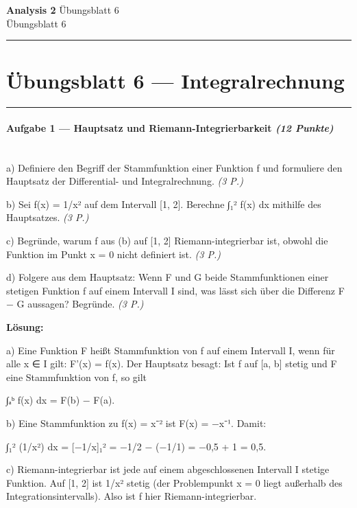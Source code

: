 \documentclass[11pt, a4paper]{article}
\providecommand{\nichttitle}{Übungsblatt}
\providecommand{\nichtsubtitle}{}
\renewcommand{\nichttitle}{Analysis 2}
\renewcommand{\nichtsubtitle}{Übungsblatt 6}
\begin{document}
\begin{center}
{\Large\bfseries\color{accent}\nichttitle}
\ifx\nichtsubtitle\empty\else
  \\[2pt]{\normalsize\color{accent!80!black}\nichtsubtitle}
\fi
\\[2pt]
\color{accent}\rule{0.4\linewidth}{0.8pt}\color{black}
\end{center}
\vspace{4pt}


\section{Übungsblatt 6 — Integralrechnung}


\noindent\textcolor{rulegray}{\rule{\linewidth}{0.4pt}}


\paragraph{Aufgabe 1 — Hauptsatz und Riemann-Integrierbarkeit \textit{(12 Punkte)}}\mbox{}\\[2pt]

a) Definiere den Begriff der Stammfunktion einer Funktion f und formuliere den Hauptsatz der Differential- und Integralrechnung. \textit{(3 P.)}


b) Sei f(x) = 1/x² auf dem Intervall [1, 2]. Berechne ∫₁² f(x) dx mithilfe des Hauptsatzes. \textit{(3 P.)}


c) Begründe, warum f aus (b) auf [1, 2] Riemann-integrierbar ist, obwohl die Funktion im Punkt x = 0 nicht definiert ist. \textit{(3 P.)}


d) Folgere aus dem Hauptsatz: Wenn F und G beide Stammfunktionen einer stetigen Funktion f auf einem Intervall I sind, was lässt sich über die Differenz F − G aussagen? Begründe. \textit{(3 P.)}


\textbf{Lösung:}


a) Eine Funktion F heißt Stammfunktion von f auf einem Intervall I, wenn für alle x ∈ I gilt: F'(x) = f(x). Der Hauptsatz besagt: Ist f auf [a, b] stetig und F eine Stammfunktion von f, so gilt

∫ₐᵇ f(x) dx = F(b) − F(a).


b) Eine Stammfunktion zu f(x) = x⁻² ist F(x) = −x⁻¹. Damit:

∫₁² (1/x²) dx = [−1/x]₁² = −1/2 − (−1/1) = −0,5 + 1 = 0,5.


c) Riemann-integrierbar ist jede auf einem abgeschlossenen Intervall I stetige Funktion. Auf [1, 2] ist 1/x² stetig (der Problempunkt x = 0 liegt außerhalb des Integrationsintervalls). Also ist f hier Riemann-integrierbar.
\end{document}
